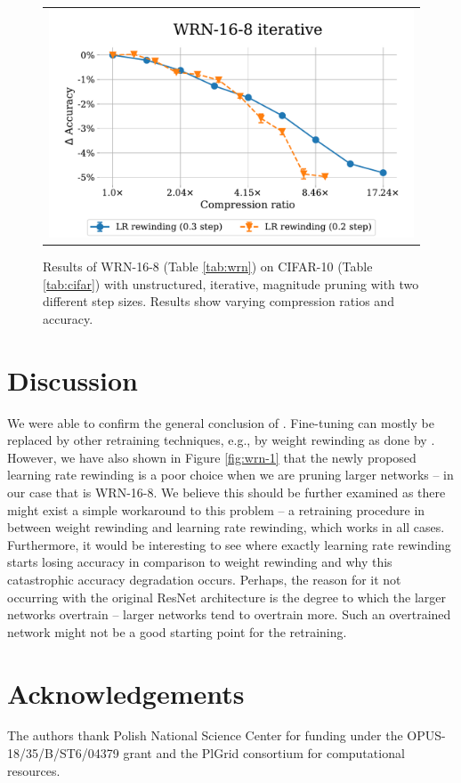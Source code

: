 \begin{figure}[H]
\setlength{\tabcolsep}{0pt}
  \begin{center}
    \begin{tabular}{c}
      \includegraphics[width=0.7\linewidth]{pics/WRN-16-8-LR-rew-compare2v3.pdf}\\
    \end{tabular}
  \end{center}
\caption{Results of WRN-16-8 (Table \ref{tab:wrn}) on CIFAR-10 (Table \ref{tab:cifar}) with unstructured, iterative, magnitude pruning with two different step sizes. Results show varying compression ratios and accuracy.}
\label{fig:wrn-2}
\end{figure}

\section{Discussion}

We were able to confirm the general conclusion of \cite{Renda}. Fine-tuning can mostly be replaced by other retraining techniques, e.g., by weight rewinding as done by \cite{Frankle}. However, we have also shown in Figure \ref{fig:wrn-1} that the newly proposed learning rate rewinding is a poor choice when we are pruning larger networks -- in our case that is WRN-16-8. We believe this should be further examined as there might exist a simple workaround to this problem -- a retraining procedure in between weight rewinding and learning rate rewinding, which works in all cases. Furthermore, it would be interesting to see where exactly learning rate rewinding starts losing accuracy in comparison to weight rewinding and why this catastrophic accuracy degradation occurs. Perhaps, the reason for it not occurring with the original ResNet architecture is the degree to which the larger networks overtrain -- larger networks tend to overtrain more. Such an overtrained network might not be a good starting point for the retraining.


\section*{Acknowledgements}
The authors thank Polish National Science Center for funding
under the OPUS-18/35/B/ST6/04379 grant and the PlGrid
consortium for computational resources.
